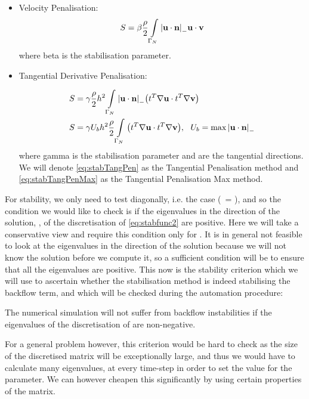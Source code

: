 \begin{itemize}
    \item Velocity Penalisation:
    \begin{equation}\label{eq:stabVeloPen}
        S = \beta\frac{\rho}{2}\int\limits_{\Gamma_{N}} \abs{{\textbf{u}} \cdot {\textbf{n}} }_- {\textbf{u}} \cdot {\textbf{v}}
    \end{equation}
    where beta is the stabilisation parameter.
    \item Tangential Derivative Penalisation:

\begin{align}
        S &= \gamma\frac{\rho}{2}h^{2}\int\limits_{\Gamma_{N}} \abs{{\textbf{u}} \cdot {\textbf{n}} }_- \qty(t^{T}\nabla{\textbf{u}} \cdot t^{T}\nabla{\textbf{v}})\label{eq:stabTangPen}\\
        S &= \gamma U_b h^2 \frac{\rho}{2} \int\limits_{\Gamma_{N}} \qty(t^{T}\nabla{\textbf{u}} \cdot t^{T}\nabla{\textbf{v}}),  ~~U_b = \max \abs{{\textbf{u}} \cdot {\textbf{n}}}_-\label{eq:stabTangPenMax}
\end{align}
    where gamma is the stabilisation parameter and  are the tangential directions. We will denote \autoref{eq:stabTangPen} as the Tangential Penalisation method and \autoref{eq:stabTangPenMax} as the Tangential Penalisation Max method.
\end{itemize}


For stability, we only need to test diagonally, i.e. the case (\bmv~= \bmu), and so the condition we would like to check is if the eigenvalues in the direction of the solution, \bmu, of the discretisation of \autoref{eq:stabfunc2} are positive. Here we will take a conservative view and require this condition only for . It is in general not feasible to look at the eigenvalues in the direction of the solution because we will not know the solution before we compute it, so a sufficient condition will be to ensure that all the eigenvalues are positive. This now is the stability criterion which we will use to ascertain whether the stabilisation method is indeed stabilising the backflow term, and which will be checked during the automation procedure:
\theoremstyle{definition}
\begin{criterion}
The numerical simulation will not suffer from backflow instabilities if the eigenvalues of the discretisation of  are non-negative.
\end{criterion}
For a general problem however, this criterion would be hard to check as the size of the discretised matrix will be exceptionally large, and thus we would have to calculate many eigenvalues, at every time-step in order to set the value for the parameter. We can however cheapen this significantly by using certain properties of the matrix.


